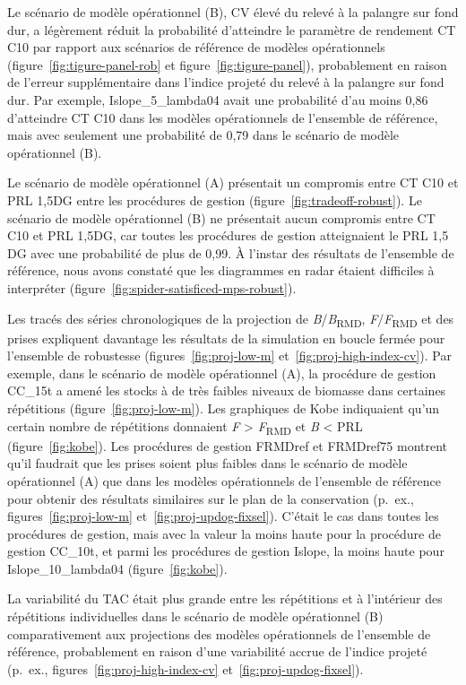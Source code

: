 \documentclass[11pt]{book}
\begin{document}
Le scénario de modèle opérationnel (B), CV élevé du relevé à la palangre sur fond dur, a légèrement réduit la probabilité d'atteindre le paramètre de rendement CT C10 par rapport aux scénarios de référence de modèles opérationnels (figure~\ref{fig:tigure-panel-rob} et figure~\ref{fig:tigure-panel}), probablement en raison de l'erreur supplémentaire dans l'indice projeté du relevé à la palangre sur fond dur. Par exemple, Islope\_5\_lambda04 avait une probabilité d'au moins 0,86 d'atteindre CT C10 dans les modèles opérationnels de l'ensemble de référence, mais avec seulement une probabilité de 0,79 dans le scénario de modèle opérationnel (B).

Le scénario de modèle opérationnel (A) présentait un compromis entre CT C10 et PRL 1,5DG entre les procédures de gestion (figure~\ref{fig:tradeoff-robust}). Le scénario de modèle opérationnel (B) ne présentait aucun compromis entre CT C10 et PRL 1,5DG, car toutes les procédures de gestion atteignaient le PRL 1,5 DG avec une probabilité de plus de 0,99. À l'instar des résultats de l'ensemble de référence, nous avons constaté que les diagrammes en radar étaient difficiles à interpréter (figure~\ref{fig:spider-satisficed-mps-robust}).

Les tracés des séries chronologiques de la projection de \emph{B}/\emph{B}\textsubscript{RMD}, \emph{F}/\emph{F}\textsubscript{RMD} et des prises expliquent davantage les résultats de la simulation en boucle fermée pour l'ensemble de robustesse (figures~\ref{fig:proj-low-m} et~\ref{fig:proj-high-index-cv}). Par exemple, dans le scénario de modèle opérationnel (A), la procédure de gestion CC\_15t a amené les stocks à de très faibles niveaux de biomasse dans certaines répétitions (figure~\ref{fig:proj-low-m}). Les graphiques de Kobe indiquaient qu'un certain nombre de répétitions donnaient \emph{F} \textgreater{} \emph{F}\textsubscript{RMD} et \emph{B} \textless{} PRL (figure~\ref{fig:kobe}). Les procédures de gestion FRMDref et FRMDref75 montrent qu'il faudrait que les prises soient plus faibles dans le scénario de modèle opérationnel (A) que dans les modèles opérationnels de l'ensemble de référence pour obtenir des résultats similaires sur le plan de la conservation (p.~ex., figures~\ref{fig:proj-low-m} et~\ref{fig:proj-updog-fixsel}). C'était le cas dans toutes les procédures de gestion, mais avec la valeur la moins haute pour la procédure de gestion CC\_10t, et parmi les procédures de gestion Islope, la moins haute pour Islope\_10\_lambda04 (figure~\ref{fig:kobe}).

La variabilité du TAC était plus grande entre les répétitions et à l'intérieur des répétitions individuelles dans le scénario de modèle opérationnel (B) comparativement aux projections des modèles opérationnels de l'ensemble de référence, probablement en raison d'une variabilité accrue de l'indice projeté (p.~ex., figures~\ref{fig:proj-high-index-cv} et~\ref{fig:proj-updog-fixsel}).
\end{document}

